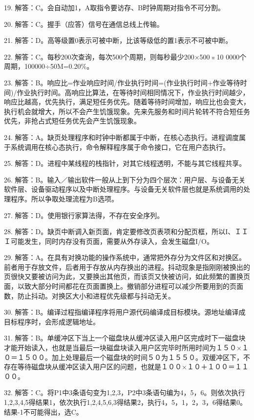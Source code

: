 19. 解答：C。会自动加1，A取指令要访存、B时钟周期对指令不可分割。

20. 解答：C。握手（应答）信号在通信总线上传输。

21. 解答：D。高等级置0表示可被中断，比该等级低的置1表示不可被中断。

22. 解答：C。每秒200次查询，每次500个周期，则每秒最少200×500﹦10 0000个周期，100000÷50M=0.20\%。

23. 解答：B。响应比=作业响应时间/作业执行时间=(作业执行时间+作业等待时间)/作业执行时间。高响应比算法，在等待时间相同情况下，作业执行时间越少，响应比越高，优先执行，满足短任务优先。随着等待时间增加，响应比也会变大，执行机会就增大，所以不会产生饥饿现象。先来先服务和时间片轮转不符合短任务优先，非抢占式短任务优先会产生饥饿现象。

24. 解答：A。缺页处理程序和时钟中断都属于中断，在核心态执行。进程调度属于系统调用在核心态执行，命令解释程序属于命令接口，它在用户态执行。

25. 解答：D。进程中某线程的栈指针，对其它线程透明，不能与其它线程共享。

26. 解答：B。输入／输出软件一般从上到下分为四个层次：用户层、与设备无关软件层、设备驱动程序以及中断处理程序。与设备无关软件层也就是系统调用的处理程序。所以争取处理流程为B选项。

27. 解答：D。使用银行家算法得，不存在安全序列。

28. 解答：D。缺页中断调入新页面，肯定要修改页表项和分配页框，所以I、ＩＩＩ可能发生，同时内存没有页面，需要从外存读入，会发生磁盘I/O。

29. 解答：A。在具有对换功能的操作系统中，通常把外存分为文件区和对换区。前者用于存放文件，后者用于存放从内存换出的进程。抖动现象是指刚刚被换出的页很快又要被访问为此，又要换出其他页，而该页又快被访问，如此频繁的置换页面，以致大部分时间都花在页面置换上。撤销部分进程可以减少所要用到的页面数，防止抖动。对换区大小和进程优先级都与抖动无关。

30. 解答：B。编译过程指编译程序将用户源代码编译成目标模块。源地址编译成目标程序时，会形成逻辑地址。

31. 解答：B。单缓冲区下当上一个磁盘块从缓冲区读入用户区完成时下一磁盘块才能开始读入，也就是当最后一块磁盘块读入用户区完毕时所用时间为１５０×１０＝１５００。加上处理最后一个磁盘块的时间５０为１５５０。双缓冲区下，不存在等待磁盘块从缓冲区读入用户区的问题，也就是１００×１０＋１００＝１１００。

32. 解答：C。将P1中3条语句变为1,2,3，P2中3条语句编为4，5，6。则依次执行1,2,3,4,5得结果1，依次执行1,2,4,5,6,3得结果2，执行4，5，1，2，3，6得结果0。结果-1不可能得出，选C。

